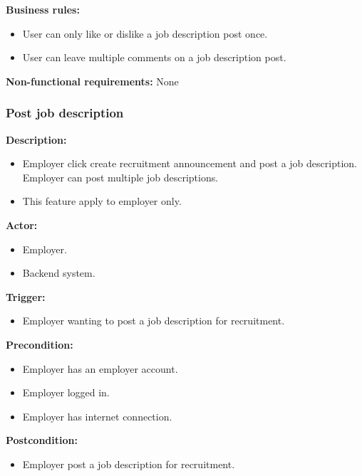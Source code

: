 \documentclass[a4paper]{article}
\begin{document}
        \textbf{Business rules:}
        \begin{itemize}
            \item User can only like or dislike a job description post once.
            \item User can leave multiple comments on a job description post.
        \end{itemize}

        \textbf{Non-functional requirements:}
        None

        \subsubsection{Post job description}
        \textbf{Description:}
        \begin{itemize}
            \item Employer click create recruitment announcement and post a job description. Employer can post multiple job descriptions.
            \item This feature apply to employer only.
        \end{itemize}

        \textbf{Actor:}
        \begin{itemize}
            \item Employer.
            \item Backend system.
        \end{itemize}

        \textbf{Trigger:}
        \begin{itemize}
            \item Employer wanting to post a job description for recruitment.
        \end{itemize}

        \textbf{Precondition:}
        \begin{itemize}
            \item Employer has an employer account.
            \item Employer logged in.
            \item Employer has internet connection.
        \end{itemize}

        \textbf{Postcondition:}
        \begin{itemize}
            \item Employer post a job description for recruitment.
        \end{itemize}
\end{document}
